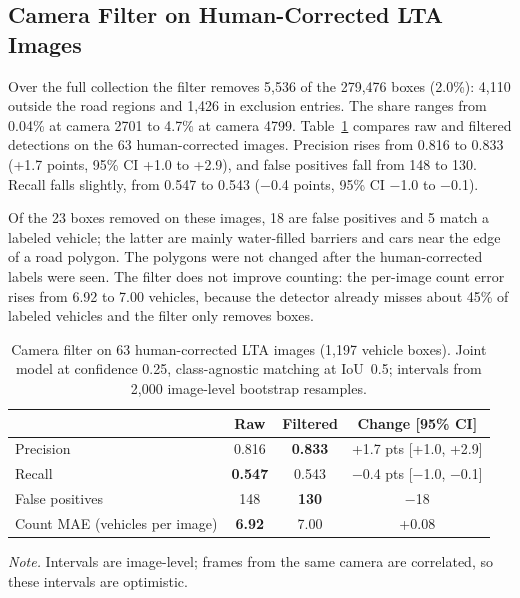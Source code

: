 \subsection{Camera Filter on Human-Corrected LTA Images}\label{sec:results-filter}

Over the full collection the filter removes 5,536 of the 279,476 boxes (2.0\%):
4,110 outside the road regions and 1,426 in exclusion entries. The share ranges
from 0.04\% at camera 2701 to 4.7\% at camera 4799. Table~\ref{tab:filter}
compares raw and filtered detections on the 63 human-corrected images. Precision
rises from 0.816 to 0.833 (+1.7 points, 95\% CI +1.0 to +2.9), and false
positives fall from 148 to 130. Recall falls slightly, from 0.547 to 0.543
(−0.4 points, 95\% CI −1.0 to −0.1).

Of the 23 boxes removed on these images, 18 are false positives and 5 match a
labeled vehicle; the latter are mainly water-filled barriers and cars near the
edge of a road polygon. The polygons were not changed after the human-corrected
labels were seen. The filter does not improve counting:
the per-image count error rises from 6.92 to 7.00 vehicles, because the detector
already misses about 45\% of labeled vehicles and the filter only removes boxes.

\begin{table}[htbp]
  \centering
  \small
  \caption{Camera filter on 63 human-corrected LTA images (1,197 vehicle boxes).
  Joint model at confidence 0.25, class-agnostic matching at IoU~0.5; intervals
  from 2,000 image-level bootstrap resamples.}
  \label{tab:filter}
  \begin{tabular}{@{}lccc@{}}
    \toprule
     & Raw & Filtered & Change [95\% CI] \\
    \midrule
    Precision                      & 0.816 & \textbf{0.833} & +1.7 pts [+1.0, +2.9] \\
    Recall                         & \textbf{0.547} & 0.543 & −0.4 pts [−1.0, −0.1] \\
    False positives                & 148 & \textbf{130} & −18 \\
    Count MAE (vehicles per image) & \textbf{6.92} & 7.00 & +0.08 \\
    \bottomrule
  \end{tabular}
  \par\smallskip
  \begin{minipage}{\linewidth}\footnotesize
    \textit{Note.} Intervals are image-level; frames from the same camera are
    correlated, so these intervals are optimistic.
  \end{minipage}
\end{table}

